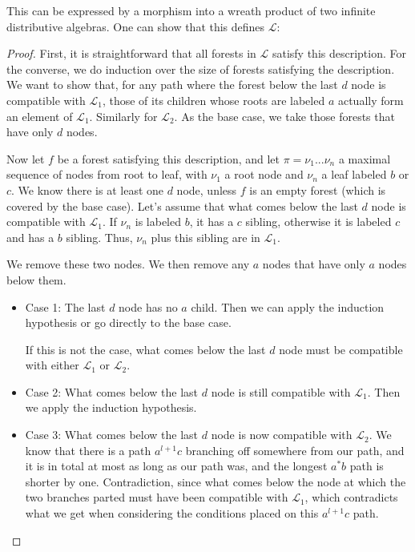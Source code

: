 \documentclass[sigplan,9pt]{acmart}\settopmatter{printfolios=true,printccs=false,printacmref=false}
\theoremstyle{definition}
\newcommand{\La}[0]{{\mathcal{L}}}
\begin{document}
This can be expressed by a morphism into a wreath product of two infinite distributive algebras.
One can show that this defines $\La$:

\begin{proof}
First, it is straightforward that all forests in $\La$ satisfy this description.
For the converse, we do induction over the size of forests satisfying the description.
We want to show that, for any path where the forest below the last $d$ node is compatible with $\La_1$, those of its children whose roots are labeled $a$ actually form an element of $\La_1$. Similarly for $\La_2$.
As the base case, we take those forests that have only $d$ nodes.

Now let $f$ be a forest satisfying this description, and let $\pi = \nu_1 ... \nu_n$ a maximal sequence of nodes from root to leaf, with $\nu_1$ a root node and $\nu_n$ a leaf labeled $b$ or $c$.
We know there is at least one $d$ node, unless $f$ is an empty forest (which is covered by the base case).
Let's assume that what comes below the last $d$ node is compatible with $\La_1$.
If $\nu_n$ is labeled $b$, it has a $c$ sibling, otherwise it is labeled $c$ and has a $b$ sibling.
Thus, $\nu_n$ plus this sibling are in $\La_1$.

We remove these two nodes. We then remove any $a$ nodes that have only $a$ nodes below them.

\begin{itemize}
\item Case 1: The last $d$ node has no $a$ child. Then we can apply the induction hypothesis or go directly to the base case.

If this is not the case, what comes below the last $d$ node must be compatible with either $\La_1$ or $\La_2$.

\item Case 2: What comes below the last $d$ node is still compatible with $\La_1$. Then  we apply the induction hypothesis.

\item Case 3: What comes below the last $d$ node is now compatible with $\La_2$.
We know that there is a path $a^{l+1}c$ branching off somewhere from our path, and it is in total at most as long as our path was, and the longest $a^*b$ path is shorter by one.
Contradiction, since what comes below the node at which the two branches parted must have been compatible with $\La_1$, which contradicts what we get when considering the conditions placed on this $a^{l+1}c$ path.
\end{itemize}


\end{proof}
\end{document}
